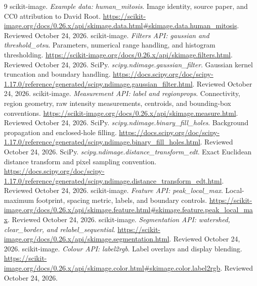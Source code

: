 \documentclass[11pt,letterpaper]{article}
\begin{document}
\clearpage
{}
\begin{thebibliography}{9}
scikit-image. \emph{Example data: human\_mitosis}. Image identity, source paper, and CC0 attribution to David Root.
\url{https://scikit-image.org/docs/0.26.x/api/skimage.data.html#skimage.data.human_mitosis}.
Reviewed October 24, 2026.
scikit-image. \emph{Filters API: gaussian and threshold\_otsu}. Parameters, numerical range handling, and histogram thresholding.
\url{https://scikit-image.org/docs/0.26.x/api/skimage.filters.html}.
Reviewed October 24, 2026.
SciPy. \emph{scipy.ndimage.gaussian\_filter}. Gaussian kernel truncation and boundary handling.
\url{https://docs.scipy.org/doc/scipy-1.17.0/reference/generated/scipy.ndimage.gaussian_filter.html}.
Reviewed October 24, 2026.
scikit-image. \emph{Measurement API: label and regionprops}. Connectivity, region geometry, raw intensity measurements, centroids, and bounding-box conventions.
\url{https://scikit-image.org/docs/0.26.x/api/skimage.measure.html}.
Reviewed October 24, 2026.
SciPy. \emph{scipy.ndimage.binary\_fill\_holes}. Background propagation and enclosed-hole filling.
\url{https://docs.scipy.org/doc/scipy-1.17.0/reference/generated/scipy.ndimage.binary_fill_holes.html}.
Reviewed October 24, 2026.
SciPy. \emph{scipy.ndimage.distance\_transform\_edt}. Exact Euclidean distance transform and pixel sampling convention.
\url{https://docs.scipy.org/doc/scipy-1.17.0/reference/generated/scipy.ndimage.distance_transform_edt.html}.
Reviewed October 24, 2026.
scikit-image. \emph{Feature API: peak\_local\_max}. Local-maximum footprint, spacing metric, labels, and boundary controls.
\url{https://scikit-image.org/docs/0.26.x/api/skimage.feature.html#skimage.feature.peak_local_max}.
Reviewed October 24, 2026.
scikit-image. \emph{Segmentation API: watershed, clear\_border, and relabel\_sequential}.
\url{https://scikit-image.org/docs/0.26.x/api/skimage.segmentation.html}.
Reviewed October 24, 2026.
scikit-image. \emph{Colour API: label2rgb}. Label overlays and display blending.
\url{https://scikit-image.org/docs/0.26.x/api/skimage.color.html#skimage.color.label2rgb}.
Reviewed October 24, 2026.
\end{thebibliography}
\end{document}
